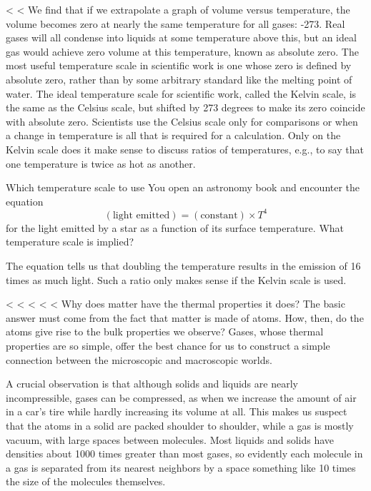 <%
<%
We find that if we extrapolate a graph of volume versus
temperature, the volume becomes zero at nearly the same
temperature for all gases: -273\degcunit. Real gases will all
condense into liquids at some temperature above this, but an
ideal gas would achieve zero volume at this temperature,
known as absolute zero. The most useful temperature scale in
scientific work is one whose zero is defined by absolute
zero, rather than by some arbitrary standard like the
melting point of water. The ideal temperature scale
for scientific work, called the Kelvin scale, is
the same as the Celsius scale, but shifted by 273 degrees to
make its zero coincide with absolute zero. Scientists use
the Celsius scale only for comparisons or when a change in
temperature is all that is required for a calculation. Only
on the Kelvin scale does it make sense to discuss ratios of
temperatures, e.g., to say that one temperature is twice as
hot as another.

\begin{eg}{Which temperature scale to use}
\egquestion
You open an astronomy book and encounter the
equation
\begin{equation*}
        (\text{light emitted}) = (\text{constant}) \times  T^ 4
\end{equation*}
for the light emitted by a star as a function of its surface
temperature. What temperature scale is implied?

\eganswer
The equation tells us that doubling the
temperature results in the emission of 16 times as much
light. Such a ratio only makes sense if the Kelvin scale is
used.
\end{eg}


\vfill
<%
<%
<%
<%
<%
Why does matter have the thermal properties it does? The
basic answer must come from the fact that matter is made of
atoms.
How, then, do the atoms give rise to the bulk properties we
observe? Gases, whose thermal properties are so simple,
offer the best chance for us to construct a simple
connection between the microscopic and macroscopic worlds.

A crucial observation is that although solids and liquids
are nearly incompressible, gases can be compressed, as when
we increase the amount of air in a car's tire while hardly
increasing its volume at all. This makes us suspect that the
atoms in a solid are packed shoulder to shoulder, while a
gas is mostly vacuum, with large spaces between molecules.
Most liquids and solids have densities about 1000 times
greater than most gases, so evidently each molecule in a gas
is separated from its nearest neighbors by a space something
like 10 times the size of the molecules themselves.

